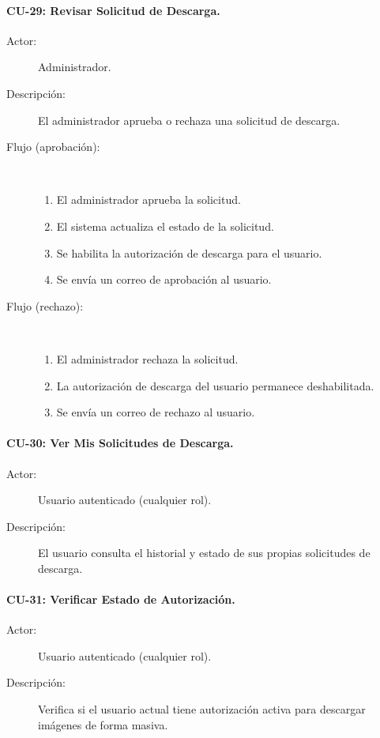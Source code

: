 \paragraph{CU-29: Revisar Solicitud de Descarga.}
\begin{description}
    \item[Actor:] Administrador.
    \item[Descripción:] El administrador aprueba o rechaza una solicitud de descarga.
    \item[Flujo (aprobación):]~
    \begin{enumerate}
        \item El administrador aprueba la solicitud.
        \item El sistema actualiza el estado de la solicitud.
        \item Se habilita la autorización de descarga para el usuario.
        \item Se envía un correo de aprobación al usuario.
    \end{enumerate}
    \item[Flujo (rechazo):]~
    \begin{enumerate}
        \item El administrador rechaza la solicitud.
        \item La autorización de descarga del usuario permanece deshabilitada.
        \item Se envía un correo de rechazo al usuario.
    \end{enumerate}
\end{description}

\paragraph{CU-30: Ver Mis Solicitudes de Descarga.}
\begin{description}
    \item[Actor:] Usuario autenticado (cualquier rol).
    \item[Descripción:] El usuario consulta el historial y estado de sus propias solicitudes de descarga.
\end{description}

\paragraph{CU-31: Verificar Estado de Autorización.}
\begin{description}
    \item[Actor:] Usuario autenticado (cualquier rol).
    \item[Descripción:] Verifica si el usuario actual tiene autorización activa para descargar imágenes de forma masiva.
\end{description}

